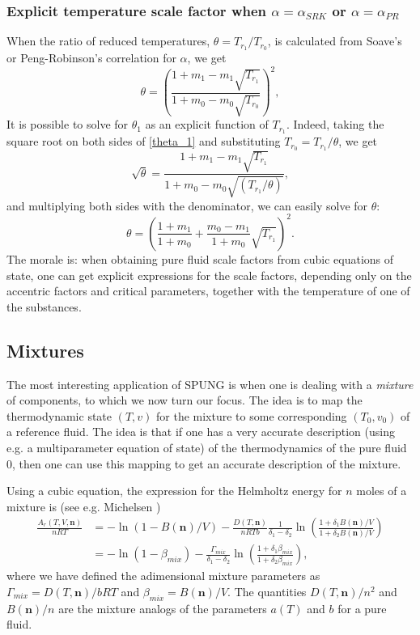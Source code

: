 \documentclass[internal,english]{sintefmemo2012}
\newcommand{\mbn}[0]{\mathbf n}
\newcommand{\lp}{\left(}
\newcommand{\rp}{\right)}
\numberwithin{equation}{section}
\begin{document}
\subsubsection*{Explicit temperature scale factor when $\alpha=\alpha_{SRK}$ or $\alpha=\alpha_{PR}$}
When the ratio of reduced temperatures, $\theta = T_{r_1}/T_{r_0}$, is
calculated from Soave's or Peng-Robinson's correlation for $\alpha$, we get
\begin{equation}
  \label{theta_1}
  \theta = \lp \frac{1+m_1-m_1 \sqrt{T_{r_1}}}{1+m_0-m_0
    \sqrt{T_{r_0}}} \rp^2,
\end{equation}
It is possible to solve for $\theta_1$ as an explicit function of
$T_{r_1}$. Indeed, taking the square root on both sides of \eqref{theta_1}
and substituting $T_{r_0} = T_{r_1}/\theta$, we get
$$
\sqrt{\theta} = \frac{1+m_1-m_1 \sqrt{T_{r_1}}}{1+m_0-m_0 \sqrt{(T_{r_1}/\theta)} },
$$
and multiplying both sides with the denominator, we can easily solve for $\theta$:
$$
\theta = \lp \frac{1+m_1}{1+m_0} + \frac{m_0-m_1}{1+m_0}
\sqrt{T_{r_1}} \rp^2.
$$
The morale is: when obtaining pure fluid scale factors from cubic equations of
state, one can get explicit expressions for the scale factors,
depending only on the accentric factors and critical parameters, together with the
temperature of one of the substances.

\subsection{Mixtures} %
The most interesting application of SPUNG is when one is dealing with a \textit{mixture} of components, to which we now turn our focus. The idea is to map the thermodynamic state $(T,v)$ for the mixture to some corresponding $(T_0,v_0)$ of a reference fluid. The idea is that if one has a very accurate description (using e.g. a multiparameter equation of state) of the thermodynamics of the pure fluid $0$, then one can use this mapping to get an accurate description of the mixture.

Using a cubic equation, the expression for the Helmholtz energy for
$n$ moles of a mixture is (see e.g. Michelsen \cite[p.105--107]{Michelsen07})
\begin{align*}
  \frac{A_r(T,V,\mbn)}{nRT} &= -\ln(1-B(\mbn)/V)-\frac{D(T,\mbn)}{nRTb}\frac{1}{\delta_1-\delta_2}\ln \lp \frac{1+\delta_1 B(\mbn)/V}{1+\delta_2 B(\mbn)/V} \rp \\[1.5pt]
  &= -\ln(1-\beta_{mix}) - \frac{\Gamma_{mix}}{\delta_1-\delta_2} \ln
  \lp \frac{1+\delta_1 \beta_{mix}}{1+\delta_2 \beta_{mix}} \rp,
\end{align*}
where we have defined the adimensional mixture parameters
as $\Gamma_{mix} = D(T,\mbn)/bRT$ and $\beta_{mix}=B(\mbn)/V$. The quantities
$D(T,\mbn)/n^2$ and $B(\mbn)/n$ are the mixture analogs of the parameters $a(T)$
and $b$ for a pure fluid.
\end{document}
